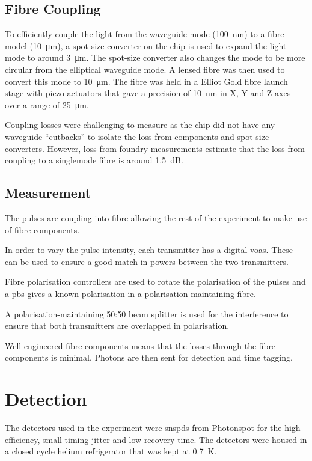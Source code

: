 \subsection{Fibre Coupling}

To efficiently couple the light from the waveguide mode (\SI{100}{\nm}) to a fibre model (\SI{10}{\micro\meter}), a spot-size converter on the chip is used to expand the light mode to around \SI{3}{\micro\meter}. The spot-size converter also changes the mode to be more circular from the elliptical waveguide mode. A lensed fibre was then used to convert this mode to \SI{10}{\micro\meter}. The fibre was held in a Elliot Gold fibre launch stage with piezo actuators that gave a precision of \SI{10}{\nm} in X, Y and Z axes over a range of \SI{25}{\micro\meter}.

Coupling losses were challenging to measure as the chip did not have any waveguide ``cutbacks'' to isolate the loss from components and spot-size converters.  However, loss from foundry measurements estimate that the loss from coupling to a singlemode fibre is around \SI{1.5}{dB}.

\subsection{Measurement}

The pulses are coupling into fibre allowing the rest of the experiment to make use of fibre components. 

In order to vary the pulse intensity, each transmitter has a digital \acp{voa}. These can be used to ensure a good match in powers between the two transmitters.

Fibre polarisation controllers are used to rotate the polarisation of the pulses and a \ac{pbs} gives a known polarisation in a polarisation maintaining fibre. 

A polarisation-maintaining {50:50} beam splitter is used for the interference to ensure that both transmitters are overlapped in polarisation.

Well engineered fibre components means that the losses through the fibre components is minimal. Photons are then sent for detection and time tagging.

\section{Detection}

The detectors used in the experiment were \acp{snspd} from Photonspot for the high efficiency, small timing jitter and low recovery time. The detectors were housed in a closed cycle helium refrigerator that was kept at \SI{0.7}{K}.

